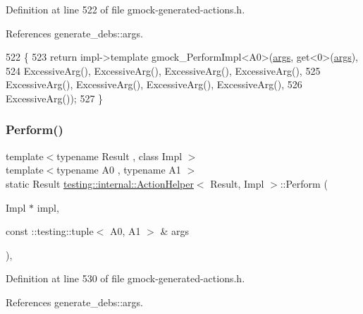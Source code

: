 Definition at line 522 of file gmock-\/generated-\/actions.\+h.



References generate\+\_\+debs\+::args.


\begin{DoxyCode}
522                                                                   \{
523     \textcolor{keywordflow}{return} impl->template gmock\_PerformImpl<A0>(\hyperlink{namespacegenerate__debs_a75f9143e38df82d83b2e8a6f99cae02c}{args}, get<0>(\hyperlink{namespacegenerate__debs_a75f9143e38df82d83b2e8a6f99cae02c}{args}),
524         ExcessiveArg(), ExcessiveArg(), ExcessiveArg(), ExcessiveArg(),
525         ExcessiveArg(), ExcessiveArg(), ExcessiveArg(), ExcessiveArg(),
526         ExcessiveArg());
527   \}
\end{DoxyCode}
\mbox{\label{classtesting_1_1internal_1_1ActionHelper_a96d8d8399ff3322e77ba1de51c166f4e}} 
\subsubsection{\texorpdfstring{Perform()}{Perform()}\hspace{0.1cm}{\footnotesize\ttfamily [3/11]}}
{\footnotesize\ttfamily template$<$typename Result , class Impl $>$ \\
template$<$typename A0 , typename A1 $>$ \\
static Result \hyperlink{classtesting_1_1internal_1_1ActionHelper}{testing\+::internal\+::\+Action\+Helper}$<$ Result, Impl $>$\+::Perform (\begin{DoxyParamCaption}\item[{Impl $\ast$}]{impl,  }\item[{const \+::testing\+::tuple$<$ A0, A1 $>$ \&}]{args }\end{DoxyParamCaption})\hspace{0.3cm}{\ttfamily [inline]}, {\ttfamily [static]}}



Definition at line 530 of file gmock-\/generated-\/actions.\+h.



References generate\+\_\+debs\+::args.


